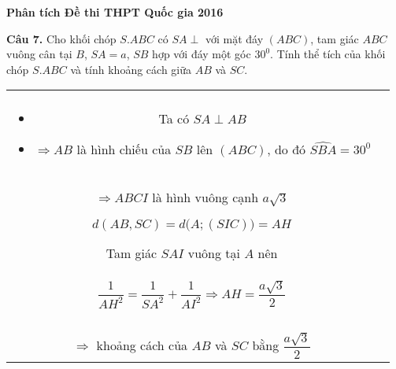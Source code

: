 \documentclass[handout]{beamer} %
\newcommand{\parallelsum}{\mathbin{\!/\mkern-5mu/\!}}
\newcommand\Fontvi{\fontsize{9}{7.2}\selectfont}
\newcommand{\cau}[2]{\begin{block}{}
		{\color{red}\textbf{Câu #1.}} #2
	\end{block}
}
\newcommand{\divColSeven}[2]{\begin{tabular}{cc}
		\begin{minipage}[c]{4.3cm} 
			#1
		\end{minipage}&
		\begin{minipage}[c]{6.9cm} 
			#2
		\end{minipage}
	\end{tabular}
}
\begin{document}
			
			\begin{frame}{\textbf{\qquad Phân tích Đề thi THPT Quốc gia 2016}}~\\[-15pt]
				\Fontvi
				\cau{7}{Cho khối chóp $S.ABC$ có $SA\perp$ với mặt đáy $(ABC)$, tam giác $ABC$ vuông cân tại $B$, $SA=a$, $SB$ hợp với đáy một góc $30^0$. Tính thể tích của khối chóp $S.ABC$ và tính khoảng cách giữa $AB$ và $SC$.}
				\divColSeven{
					\begin{center}
						
					\end{center}~\\[-20pt]
					\begin{itemize}
						\setlength{\itemindent}{-0.4cm}
						\item Ta có $SA\perp AB$
						\item $\Rightarrow AB$ là hình chiếu của $SB$ lên $(ABC)$, do đó $\widehat{SBA}=30^0$
						
					\end{itemize}
				}{
				\begin{itemize}
					\setlength{\itemindent}{-0.5cm}
					\item $\cot \widehat{SBA}=\dfrac{AB}{SA} \Rightarrow BC=a\sqrt{3}$
					\item $S_{ABC}=\dfrac{1}{2}AB.BC=\dfrac{1}{2}a\sqrt{3}.a\sqrt{3}=\dfrac{3a^2}{2}$
					\item $V=\frac{1}{3}SA.S_{ABC}=\dfrac{1}{3}.a.\dfrac{3a^2}{2}=\dfrac{a^3}{2}$
					\item Trong mp$(ABC)$, kẻ $AI\parallelsum BC$ và kẻ $CI\parallelsum AB$\\
					$\Rightarrow ABCI$ là hình vuông cạnh $a\sqrt{3}$
					\item $d(AB,SC)=d\Big(A;(SIC)\Big)=AH$
					\item Tam giác $SAI$ vuông tại $A$ nên\\[-15pt] $$\frac{1}{AH^2}=\frac{1}{SA^2}+\frac{1}{AI^2}\Rightarrow AH=\frac{a\sqrt{3}}{2}$$~\\[-0.4cm]
					$\Rightarrow$ khoảng cách của $AB$ và $SC$ bằng $\dfrac{a\sqrt{3}}{2}$
				\end{itemize}
			}
		\end{frame}
		
		
		
\end{document}
